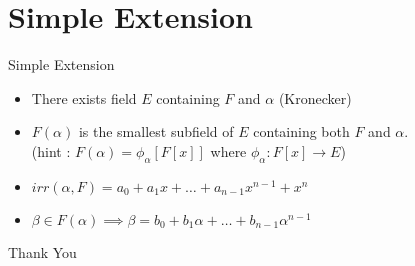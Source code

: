 \documentclass{beamer}
\begin{document}
\section{Simple Extension}
\begin{frame}{Simple Extension}
\begin{itemize}
	\item There exists field $E$ containing $F$ and $\alpha$ (Kronecker)
	\item $F(\alpha)$ is the smallest subfield of $E$ containing both $F$ and $\alpha$.\\
		(hint : $F(\alpha) = \phi_\alpha\left[F[x]\right]$ where $\phi_\alpha : F[x] \to E$)
	\item $irr(\alpha,F) = a_0 + a_1x + \dots + a_{n-1}x^{n-1} + x^n$
	\item $\beta \in F(\alpha) \implies \beta = b_0 + b_1\alpha + \dots + b_{n-1}\alpha^{n-1}$
\end{itemize}
\end{frame}

\begin{frame}
	\vspace{0.6in}
	\hspace{3cm} {\color{blue}\Huge{Thank You}}
\end{frame}
\end{document}
